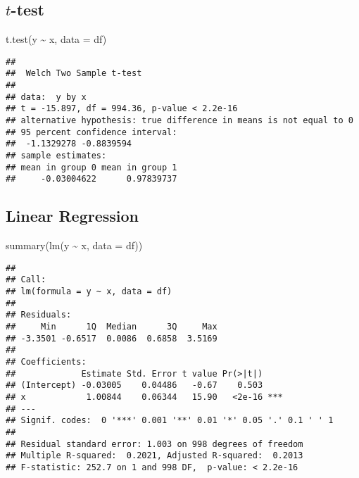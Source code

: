 \documentclass[
]{book}
\newenvironment{Shaded}{\begin{snugshade}}{\end{snugshade}}
\newcommand{\AttributeTok}[1]{\textcolor[rgb]{0.77,0.63,0.00}{#1}}
\newcommand{\FunctionTok}[1]{\textcolor[rgb]{0.00,0.00,0.00}{#1}}
\newcommand{\NormalTok}[1]{#1}
\newcommand{\SpecialCharTok}[1]{\textcolor[rgb]{0.00,0.00,0.00}{#1}}
\theoremstyle{definition}
\theoremstyle{definition}
\theoremstyle{definition}
\theoremstyle{remark}
\begin{document}
\hypertarget{t-test}{%
\subsection{\texorpdfstring{\(t\)-test}{t-test}}\label{t-test}}

\begin{Shaded}
\begin{Highlighting}[]
\FunctionTok{t.test}\NormalTok{(y }\SpecialCharTok{\textasciitilde{}}\NormalTok{ x, }\AttributeTok{data =}\NormalTok{ df)}
\end{Highlighting}
\end{Shaded}

\begin{verbatim}
## 
##  Welch Two Sample t-test
## 
## data:  y by x
## t = -15.897, df = 994.36, p-value < 2.2e-16
## alternative hypothesis: true difference in means is not equal to 0
## 95 percent confidence interval:
##  -1.1329278 -0.8839594
## sample estimates:
## mean in group 0 mean in group 1 
##     -0.03004622      0.97839737
\end{verbatim}

\hypertarget{linear-regression}{%
\subsection{Linear Regression}\label{linear-regression}}

\begin{Shaded}
\begin{Highlighting}[]
\FunctionTok{summary}\NormalTok{(}\FunctionTok{lm}\NormalTok{(y }\SpecialCharTok{\textasciitilde{}}\NormalTok{ x, }\AttributeTok{data =}\NormalTok{ df))}
\end{Highlighting}
\end{Shaded}

\begin{verbatim}
## 
## Call:
## lm(formula = y ~ x, data = df)
## 
## Residuals:
##     Min      1Q  Median      3Q     Max 
## -3.3501 -0.6517  0.0086  0.6858  3.5169 
## 
## Coefficients:
##             Estimate Std. Error t value Pr(>|t|)    
## (Intercept) -0.03005    0.04486   -0.67    0.503    
## x            1.00844    0.06344   15.90   <2e-16 ***
## ---
## Signif. codes:  0 '***' 0.001 '**' 0.01 '*' 0.05 '.' 0.1 ' ' 1
## 
## Residual standard error: 1.003 on 998 degrees of freedom
## Multiple R-squared:  0.2021, Adjusted R-squared:  0.2013 
## F-statistic: 252.7 on 1 and 998 DF,  p-value: < 2.2e-16
\end{verbatim}
\end{document}
